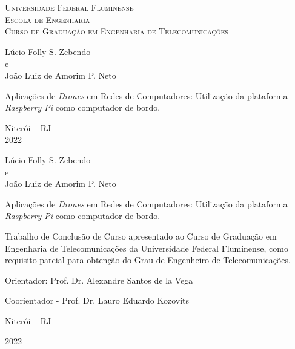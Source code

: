 \documentclass[12pt,a4paper,oneside]{book}
\begin{document}
%


\begin{titlepage}
  \begin{center}
    \Large{\textsc{Universidade Federal Fluminense} \\
           \textsc{Escola de Engenharia} \\
           \textsc{Curso de Graduação em Engenharia de Telecomunicações} 
          }
    \par\vfill
    \LARGE{Lúcio Folly S. Zebendo\\e\\João Luiz de Amorim P. Neto}
    \par\vfill
    \LARGE{Aplica\c{c}\~{o}es de \textit{Drones} em Redes de Computadores: Utilização da plataforma \textit{Raspberry Pi} como computador de bordo.}
    \par\vfill
    \Large{Niterói -- RJ\\
    2022}
  \end{center}
\end{titlepage}




\begin{center}

Lúcio Folly S. Zebendo\\e\\João Luiz de Amorim P. Neto

\vfill

Aplica\c{c}\~{o}es de \textit{Drones} em Redes de Computadores: Utilização da plataforma \textit{Raspberry Pi} como computador de bordo.

\vspace{3.0cm}

\begin{flushright}
\begin{minipage}{0.55\textwidth}
%
Trabalho de Conclusão de Curso 
apresentado ao Curso de Graduação em Engenharia de Telecomunicações 
da Universidade Federal Fluminense, 
como requisito parcial para obtenção 
do Grau de Engenheiro de Telecomunicações. 
%
\end{minipage}
\end{flushright}

\vspace{3.0cm}

Orientador: Prof. Dr. Alexandre Santos de la Vega

Coorientador - Prof. Dr. Lauro Eduardo Kozovits
\vfill

Niterói -- RJ

2022

\end{center}
\end{document}
